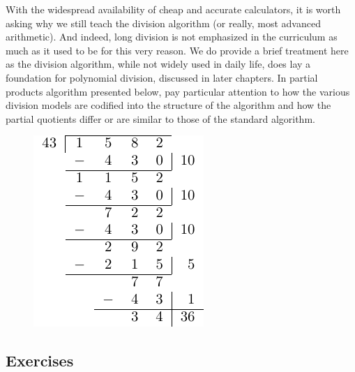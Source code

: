 \documentclass[
]{book}
\theoremstyle{definition}
\theoremstyle{definition}
\theoremstyle{definition}
\theoremstyle{definition}
\theoremstyle{remark}
\begin{document}
With the widespread availability of cheap and accurate calculators, it is worth asking why we still teach the division algorithm (or really, most advanced arithmetic). And indeed, long division is not emphasized in the curriculum as much as it used to be for this very reason. We do provide a brief treatment here as the division algorithm, while not widely used in daily life, does lay a foundation for polynomial division, discussed in later chapters. In partial products algorithm presented below, pay particular attention to how the various division models are codified into the structure of the algorithm and how the partial quotients differ or are similar to those of the standard algorithm.

\begin{figure}

{\centering \includegraphics[width=0.6\linewidth]{tikz/division-algorithm-standard} 

}

\end{figure}

\hypertarget{exercises-10}{%
\subsection{Exercises}\label{exercises-10}}
\end{document}
